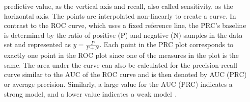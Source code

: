 predictive value, as the vertical axis and recall, also called sensitivity, as 
the horizontal axis. The points are interpolated non-linearly to create a 
curve. 
In contrast to the ROC curve, which uses a fixed reference line, the PRC's 
baseline is determined by the ratio of positive (P) and negative (N) samples in 
the data set and represented as $y = \frac{P}{P + N}$. Each point in the PRC 
plot corresponds to exactly one point in the ROC plot since one of the measures 
in the plot is the same. The area under the curve can also be 
calculated for the precision-recall curve similar to the AUC of the ROC curve 
and is then denoted by AUC (PRC) or average precision. Similarly, a large value 
for the AUC (PRC) indicates a strong model, and a lower value indicates a weak 
model \cite{RN160, RN161}.
